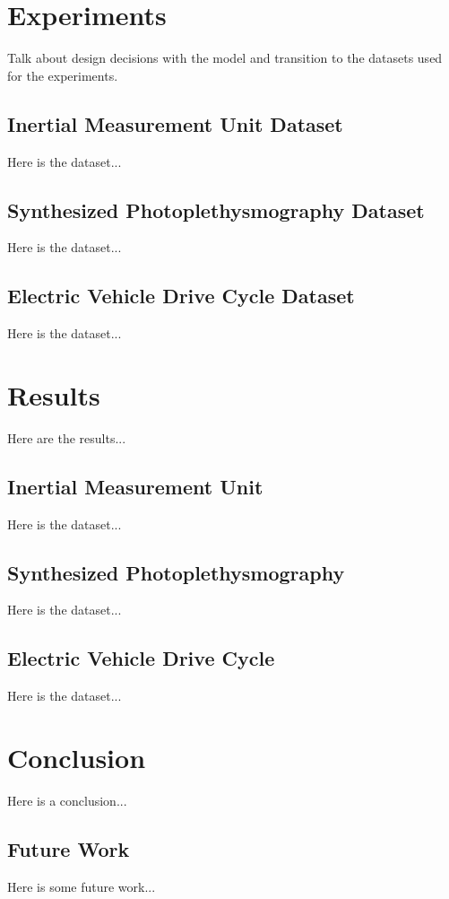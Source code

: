 \documentclass[conference]{IEEEtran}
\begin{document}
\section{Experiments}
Talk about design decisions with the model and transition to the datasets used for the experiments.

\subsection{Inertial Measurement Unit Dataset}
Here is the dataset...

\subsection{Synthesized Photoplethysmography Dataset}
Here is the dataset...

\subsection{Electric Vehicle Drive Cycle Dataset}
Here is the dataset...


\section{Results}
Here are the results...

\subsection{Inertial Measurement Unit}
Here is the dataset...

\subsection{Synthesized Photoplethysmography}
Here is the dataset...

\subsection{Electric Vehicle Drive Cycle}
Here is the dataset...


\section{Conclusion}%
Here is a conclusion...

\subsection{Future Work}
Here is some future work...
\end{document}
